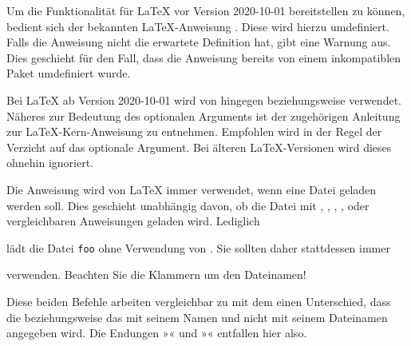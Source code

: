 Um die Funktionalität für \LaTeX{} vor Version 2020-10-01 bereitstellen zu
können, bedient sich  der bekannten
\LaTeX-Anweisung . Diese wird
hierzu umdefiniert.  Falls die Anweisung nicht die erwartete Definition hat,
gibt  eine Warnung aus.  Dies geschieht für
den Fall, dass die Anweisung bereits von einem inkompatiblen Paket umdefiniert
wurde.

Bei \LaTeX{} ab
Version 2020-10-01 wird von  hingegen
beziehungsweise
verwendet. Näheres zur Bedeutung des optionalen Arguments  ist
der zugehörigen Anleitung zur \LaTeX-Kern-Anweisung  zu
entnehmen. Empfohlen wird in der Regel der Verzicht auf das optionale
Argument. Bei älteren \LaTeX-Versionen wird dieses ohnehin ignoriert.
  
Die Anweisung  wird von \LaTeX{} immer verwendet,
wenn eine Datei geladen werden soll. Dies geschieht unabhängig davon, ob die
Datei mit , , ,
,  oder vergleichbaren Anweisungen
geladen wird. Lediglich
\begin{lstcode}
  
\end{lstcode}
lädt die Datei \texttt{foo} ohne Verwendung von . Sie
sollten daher stattdessen immer
\begin{lstcode}
  
\end{lstcode}
verwenden. Beachten Sie die Klammern um den Dateinamen!%
%
\EndIndexGroup


\begin{Declaration}
\end{Declaration}%
Diese beiden Befehle arbeiten vergleichbar zu
 mit dem einen Unterschied, dass die
 beziehungsweise das  mit seinem Namen und nicht
mit seinem Dateinamen angegeben wird. Die Endungen »« und
»« entfallen hier also.

